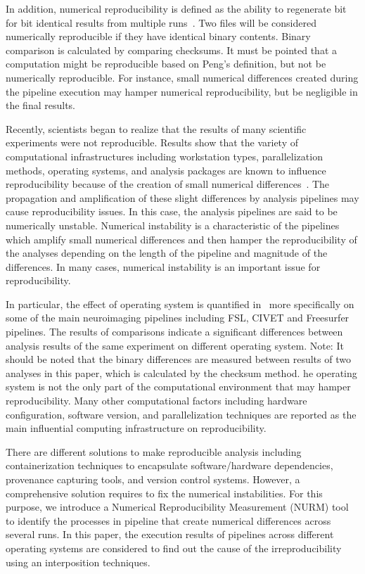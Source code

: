 \documentclass[a4paper,num-refs]{oup-contemporary}
\newcommand{\note}[2]{\color{blue}Note: #1\color{black}}
\begin{document}
In addition, numerical reproducibility is defined as the ability to 
regenerate bit for bit identical results from multiple 
runs~\cite{hill2017numerical}. Two files will be considered numerically 
reproducible if they have identical binary contents. Binary comparison 
is calculated by comparing checksums. It must be pointed that a 
computation might be reproducible based on Peng's definition, but not 
be numerically reproducible. For instance, small numerical differences 
created during the pipeline execution may hamper numerical 
reproducibility, but be negligible in the final results.

Recently, scientists began to realize that the results of many 
scientific experiments were not reproducible. Results show that the 
variety of computational infrastructures including workstation types, 
parallelization methods, operating systems, and analysis packages are 
known to influence reproducibility because of the creation of small 
numerical differences~\cite{Gronenschild2012, diethelm2012limits, 
Glatard2015, bowring2018exploring}. The propagation and amplification 
of these slight differences by analysis pipelines may cause reproducibility 
issues. 
In this case, the analysis pipelines are said to be numerically 
unstable. Numerical instability is a characteristic of the pipelines 
which amplify small numerical differences and then hamper the 
reproducibility of the analyses depending on the length of the pipeline 
and magnitude of the differences. In many cases, numerical instability is an 
important issue for reproducibility.
 
In particular, the effect of operating system is quantified 
in~\cite{Glatard2015, Gronenschild2012} more specifically on some of 
the main neuroimaging pipelines including FSL, CIVET and Freesurfer 
pipelines. The results of comparisons indicate a significant differences 
between analysis results of the same experiment on different operating 
system. \note{It should be noted that the binary 
differences are measured between results of two analyses in this paper, which is 
calculated by the checksum method. }
The operating system is not the only part of the computational 
environment that may hamper reproducibility. Many other computational 
factors including hardware configuration, software version, and 
parallelization techniques are reported as the main influential 
computing infrastructure on reproducibility. 

There are different solutions to make reproducible analysis including 
containerization techniques to encapsulate software/hardware 
dependencies, provenance capturing tools, and version control systems. 
However, a comprehensive solution requires to fix the numerical 
instabilities. For this purpose, we introduce a Numerical 
Reproducibility Measurement (NURM) tool to identify the processes in 
pipeline that create numerical differences across several runs. In this 
paper, the execution results of pipelines across different operating 
systems are considered to find out the cause of the irreproducibility 
using an interposition techniques.
\end{document}
